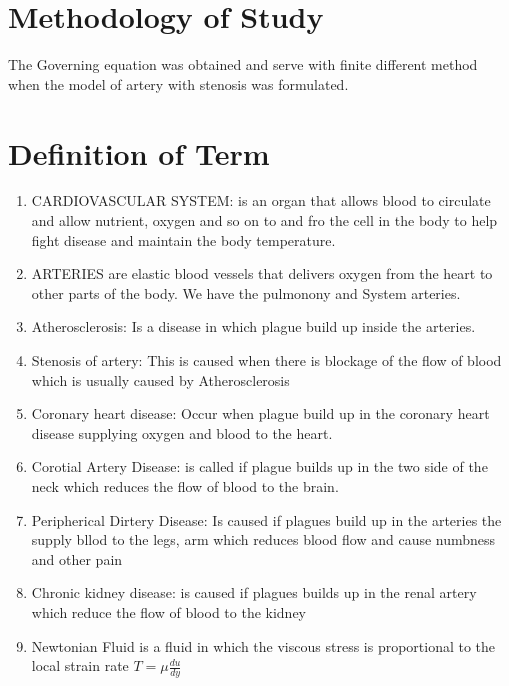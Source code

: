 \documentclass[12pt]{report}
\newcommand{\dsp}{\displaystyle}
\begin{document}
	\section{Methodology of Study}
	The Governing equation was obtained and serve with finite different method when the model of artery with stenosis was formulated.
	
	\section{Definition of Term}
	\begin{enumerate}
		\item CARDIOVASCULAR SYSTEM:  is an organ that allows blood to circulate and allow nutrient, oxygen and so on to and fro the cell in the body to help fight disease and maintain the body temperature. 
		
		\item ARTERIES are elastic blood vessels that delivers oxygen from the heart to other parts of the body. We have the pulmonony and System arteries.
		
		\item Atherosclerosis: Is a disease in which plague build up inside the arteries.
		
		\item Stenosis of artery: This is caused when there is blockage of the flow of blood which is usually caused by Atherosclerosis
		
		\item Coronary heart disease: Occur when plague build up in the coronary heart disease supplying oxygen and blood to the heart.
		
		\item Corotial Artery Disease: is called if plague builds up in the two side of the neck which reduces the flow of blood to the brain.
		
		\item Peripherical Dirtery Disease: Is caused if plagues build up in the arteries the supply bllod to the legs, arm which reduces blood flow and cause numbness and other pain
		
		
		\item Chronic kidney disease: is caused if plagues builds up in the renal artery which reduce the flow of blood to the kidney
		
		\item Newtonian Fluid is a fluid in which the viscous stress is proportional to the local strain rate $\dsp T = \mu \frac{du}{dy}$
		

\end{enumerate}
\end{document}
